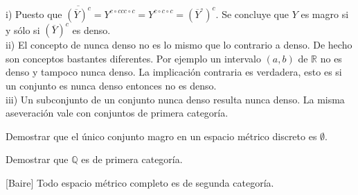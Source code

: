 \begin{observa}{} i) Puesto que  $\overline{\left({\overline{Y}}\right)^{c}}=  Y^{c\circ ccc\circ c}=Y^{c\circ c\circ c}=\left(\overline{Y}^\circ\right)^c$. Se concluye que  $Y$ es magro si y sólo si $\left({\overline{Y}}\right)^c$ es denso.
 \\
 ii) El concepto de nunca denso no es lo mismo que lo contrario a denso. De hecho son conceptos bastantes diferentes.  Por ejemplo un intervalo $(a,b)$ de $\mathbb{R}$ no es denso y tampoco nunca denso. La implicación contraria es verdadera, esto es si un conjunto es nunca denso entonces no es denso.  
 \\
 iii) Un subconjunto de un conjunto nunca denso resulta nunca denso. La misma aseveración vale con conjuntos de primera categoría. 
\end{observa}

\begin{ejercicio}{} Demostrar que el único conjunto magro en un espacio métrico discreto es $\emptyset$. 
 \end{ejercicio}

 
 \begin{ejercicio}{} Demostrar que $\mathbb{Q}$ es de primera categoría.
   \end{ejercicio}


\begin{teorema}{}[Baire] Todo espacio métrico completo es de segunda categoría.
 \end{teorema}
 
